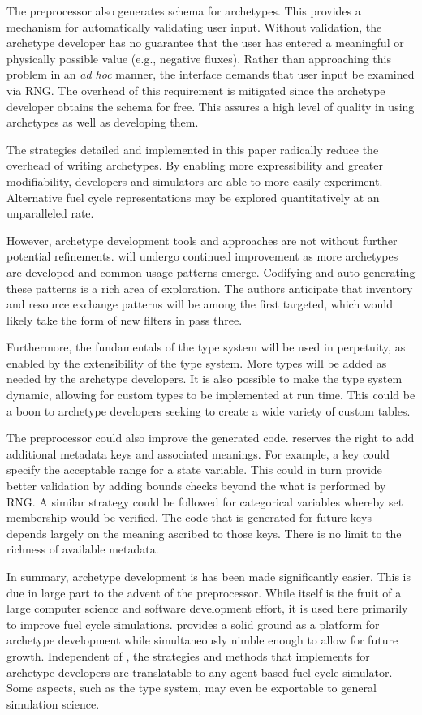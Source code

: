 The preprocessor also generates schema for archetypes. This provides a mechanism 
for automatically validating user input.  Without validation, the archetype 
developer has no guarantee that the user has entered a meaningful or physically possible 
value (e.g., negative fluxes). Rather than approaching this problem in an
\emph{ad hoc} 
manner, the \cyclus interface demands that user input be examined via \gls{RNG}.  The overhead 
of this requirement is mitigated since the archetype developer obtains the schema
for free. This assures a high level of quality in using archetypes as well as 
developing them.

The strategies detailed and implemented in this paper radically
reduce the overhead of writing archetypes. By enabling more expressibility and greater
modifiability, developers and simulators are able to more easily experiment.  
Alternative fuel cycle representations may be explored quantitatively at an
unparalleled rate.

However, archetype development tools and approaches are not without further 
potential refinements. \cycpp will undergo continued improvement 
as more archetypes are developed and common usage patterns emerge. Codifying and 
auto-generating these patterns is a rich area of exploration. The authors anticipate 
that inventory and resource exchange patterns will be among the first
targeted, 
which would likely take the form of new filters in pass three.

Furthermore, the fundamentals of the \cyclus type system will be used in 
perpetuity, as enabled by the extensibility of the type system.  More types
will be added as needed by the archetype developers.  It is also possible to 
make the type system dynamic, allowing for custom types to be implemented at run time.
This could be a boon to archetype developers seeking to create a wide variety of custom
tables.

The preprocessor could also improve the generated code. \Cyclus reserves the right
to add additional metadata keys and associated meanings.  For example, a 
key could specify the acceptable range for a state variable. This could in turn 
provide better validation by adding bounds checks beyond the what is performed
by \gls{RNG}. A similar strategy could be followed for categorical variables whereby
set membership would be verified. The code that is generated for future keys 
depends largely on the meaning ascribed to those keys. There is no limit 
to the richness of available metadata.

In summary, archetype development is has been made significantly easier. This is due in large
part to the advent of the \cyclus preprocessor. While \cycpp itself is the fruit of
a large computer science and software development effort, it is used here 
primarily to improve fuel cycle simulations. \cyclus provides a solid ground 
as a platform for archetype development while simultaneously nimble enough
to allow for future growth. Independent of \cyclus, the strategies and methods that
\cyclus implements for archetype developers are translatable to any agent-based 
fuel cycle simulator.  Some aspects, such as the type system,  may even be exportable 
to general simulation science. 


